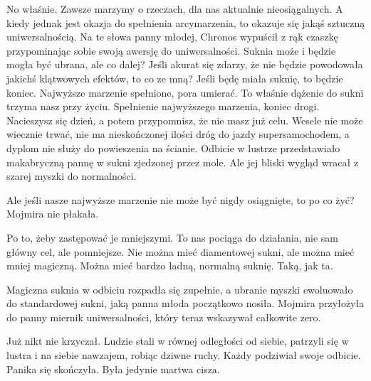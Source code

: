 \ds{} No właśnie. Zawsze marzymy o rzeczach, dla nas aktualnie nieosiągalnych.
A kiedy jednak jest okazja do spełnienia arcymarzenia, to okazuje się jakąś sztuczną uniwersalnością. \dm{} Na te słowa panny młodej, Chronos wypuścił z rąk czaszkę
przypominając sobie swoją awersję do uniwersalności. \dm{} Suknia może i będzie mogła być ubrana, ale co dalej? Jeśli akurat się zdarzy, że nie będzie powodowała
jakichś klątwowych efektów, to co ze mną? Jeśli będę miała suknię, to będzie koniec. Najwyższe marzenie spełnione, pora umierać.
To właśnie dążenie do sukni trzyma nasz przy życiu. Spełnienie najwyższego marzenia, koniec drogi. Nacieszysz się dzień, a potem przypomnisz, że nie masz już celu.
Wesele nie może wiecznie trwać, nie ma nieskończonej ilości dróg do jazdy supersamochodem, a dyplom nie służy do powieszenia na ścianie. \dm{} Odbicie w lustrze przedstawiało makabryczną pannę w 
sukni zjedzonej przez mole. Ale jej bliski wygląd wracał z szarej myszki do normalności. \de{}

\ds{} Ale jeśli nasze najwyższe marzenie nie może być nigdy osiągnięte, to po co żyć? \dm{} Mojmira nie płakała. \de{}

\ds{} Po to, żeby zastępować je mniejszymi. To nas pociąga do działania, nie sam główny cel, ale pomniejsze. 
Nie można mieć diamentowej sukni, ale można mieć mniej magiczną. Można mieć bardzo ładną, normalną suknię.
Taką, jak ta. \de{} 

Magiczna suknia w odbiciu rozpadła się zupełnie, a ubranie myszki ewoluowało do standardowej sukni, jaką panna młoda początkowo nosiła.
Mojmira przyłożyła do panny miernik uniwersalności, który teraz wskazywał całkowite zero.

\divider{}

Już nikt nie krzyczał. 
Ludzie stali w równej odległości od siebie, patrzyli się w lustra i na siebie nawzajem, robiąc dziwne ruchy.
Każdy podziwiał swoje odbicie. Panika się skończyła. Była jedynie martwa cisza.

